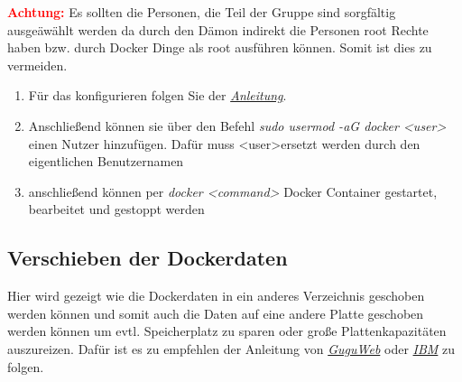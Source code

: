 \textcolor{red}{\textbf{Achtung:}} Es sollten die Personen, die Teil der Gruppe sind sorgfältig ausgeäwählt werden da durch den Dämon indirekt die Personen root Rechte haben bzw. durch Docker Dinge als root ausführen können. Somit ist dies zu vermeiden. 

\begin{enumerate}
    \item Für das konfigurieren folgen Sie der \textit{\href{https://docs.docker.com/engine/install/linux-postinstall/}{Anleitung}}. 
    \item Anschließend können sie über den Befehl \textit{ sudo usermod -aG docker \textless user\textgreater} einen Nutzer hinzufügen. Dafür muss \textless user\textgreater ersetzt werden durch den eigentlichen Benutzernamen
    \item anschließend können per \textit{docker \textless command\textgreater} Docker Container gestartet, bearbeitet und gestoppt werden
\end{enumerate}

\subsection{Verschieben der Dockerdaten}
Hier wird gezeigt wie die Dockerdaten in ein anderes Verzeichnis geschoben werden können und somit auch die Daten auf eine andere Platte geschoben werden können um evtl. Speicherplatz zu sparen oder große Plattenkapazitäten auszureizen. Dafür ist es zu empfehlen der Anleitung von \textit{\href{https://www.guguweb.com/2019/02/07/how-to-move-docker-data-directory-to-another-location-on-ubuntu/}{GuguWeb}} oder \textit{\href{https://www.ibm.com/docs/en/z-logdata-analytics/5.1.0?topic=compose-relocating-docker-root-directory}{IBM}} zu folgen.

